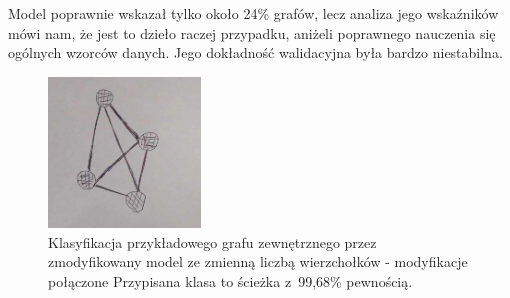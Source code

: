 Model poprawnie wskazał tylko około 24\% grafów, lecz analiza jego wskaźników mówi nam,
że jest to dzieło raczej przypadku, aniżeli poprawnego nauczenia się ogólnych wzorców danych.
Jego dokładność walidacyjna była bardzo niestabilna.

\begin{figure}[ht]
	\centering
	\includegraphics[height=4cm]{../graph_classification/test_graphs/drawn/full-3.png}
	\caption{Klasyfikacja przykładowego grafu zewnętrznego przez zmodyfikowany model ze zmienną liczbą wierzchołków - modyfikacje połączone
		Przypisana klasa to ścieżka z~99,68\% pewnością.}
	\label{Fig:tests-cv-2d}
\end{figure}
\FloatBarrier